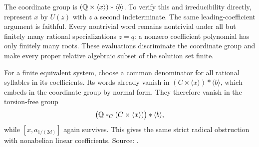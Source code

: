 The coordinate group is
\((\mathbb Q\times\langle x\rangle)*\langle b\rangle\).
To verify this and irreducibility directly, represent \(x\)
by \(U(z)\) with \(z\) a second indeterminate. The same
leading-coefficient argument is faithful. Every nontrivial
word remains nontrivial under all but finitely many rational
specializations \(z=q\): a nonzero coefficient polynomial
has only finitely many roots. These evaluations discriminate
the coordinate group and make every proper relative algebraic
subset of the solution set finite.

For a finite equivalent system, choose a common denominator
for all rational syllables in its coefficients. Its words
already vanish in
\((C\times\langle x\rangle)*\langle b\rangle\), which
embeds in the coordinate group by normal form. They
therefore vanish in the torsion-free group
\[
 \bigl(\mathbb Q*_C(C\times\langle x\rangle)\bigr)*\langle b\rangle,
\]
while \([x,a_{1/(2d)}]\) again survives. This gives the same
strict radical obstruction with nonabelian linear coefficients.
Source: .
